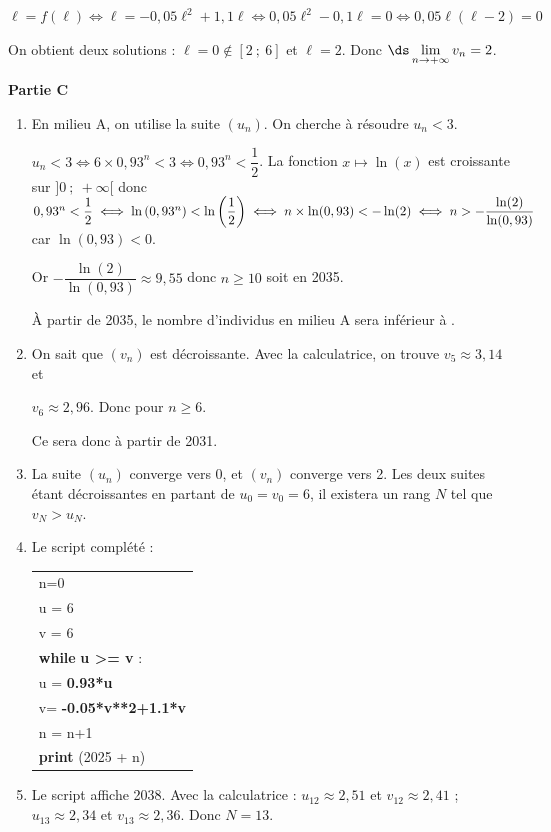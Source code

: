 \begin{enumerate}[resume]
\begin{enumerate}
		$\ell=f(\ell) \iff \ell=-0,05\ell^2+1,1\ell \iff 0,05\ell^2-0,1 \ell=0 \iff 0,05\ell(\ell-2)=0$
		
		On obtient deux solutions : $\ell=0 \notin [2~;~6]$ et $\ell=2$. Donc $\ds \lim\limits_{n \to +\infty} v_n=2$.
	\end{enumerate}
\end{enumerate}

\bigskip

\textbf{Partie C}

\medskip

\begin{enumerate}
	\item En milieu A, on utilise la suite $(u_n)$. On cherche à résoudre $u_n<3$.
	
	$u_n<3 \iff 6\times 0,93^n<3 \iff 0,93^n <\dfrac{1}{2}$. La fonction $x\mapsto \ln(x)$ est croissante sur $]0~;~+\infty[$ donc $0,93^n <\dfrac{1}{2} \iff \ln\left(0,93^n\right)<\ln\left(\dfrac{1}{2} \right) \iff n \times \ln(0,93) <-\ln(2)\\ \iff n>-\dfrac{\ln(2)}{\ln(0,93)}$ car $\ln(0,93) < 0$.
	
Or $-\dfrac{\ln(2)}{\ln(0,93)}\approx 9,55$ donc $n\geqslant 10$ soit en 2035.

À partir de 2035, le nombre d'individus en milieu A sera inférieur à .
	\item On sait que $(v_n)$ est décroissante. Avec la calculatrice, on trouve $v_5\approx 3,14$ et 
	
$v_6\approx 2,96$. Donc pour $n\geqslant 6$.
	
Ce sera donc à partir de 2031.
	\item La suite $(u_n)$ converge vers 0, et $(v_n)$ converge vers 2. Les deux suites étant décroissantes en partant de $u_0 = v_0=6$, il existera un rang $N$ tel que $v_N > u_N$.
	\item Le script complété :
	\begin{center}
		\begin{tabular}{|l|}\hline
			n=0 \\
			u = 6\\
			v = 6 \\
			\textbf{while} \textbf{u >= v} :\\
			\qquad u = \textbf{0.93*u}\\
			\qquad v= \textbf{-0.05*v**2+1.1*v}\\
			\qquad n = n+1\\
			\textbf{print} (2025 + n)\\ \hline
		\end{tabular}
	\end{center}
	\item Le script affiche 2038. Avec la calculatrice : $u_{12} \approx 2,51$ et $v_{12}\approx 2,41$ ; $u_{13} \approx 2,34$ et $v_{13}\approx 2,36$. Donc $N = 13$.
\end{enumerate}


